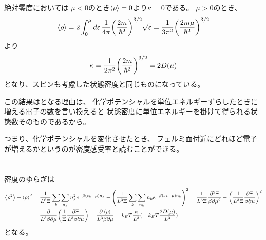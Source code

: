 \documentclass[../ap_2011.tex]{subfiles}
\begin{document}

絶対零度においては
\(\mu<0\)のとき\(\ev{\rho}=0\)より\(\kappa=0\)である。
\(\mu>0\)のとき、
\begin{equation}\begin{aligned}[b]
    \ev{\rho} = 2\int_0^\mu d\varepsilon\, \frac{1}{4\pi}\qty(\frac{2m}{\hbar^2})^{3/2}\sqrt{\varepsilon}
    =\frac{1}{3\pi^2}\qty(\frac{2m\mu}{\hbar^2})^{3/2}
\end{aligned}\end{equation}
より
\begin{equation}\begin{aligned}[b]
    \kappa = \frac{1}{2\pi^2}\qty(\frac{2m}{\hbar^2})^{3/2}=2D(\mu)
\end{aligned}\end{equation}
となり、スピンも考慮した状態密度と同じものになっている。

この結果はとなる理由は、
化学ポテンシャルを単位エネルギーずらしたときに増える電子の数を言い換えると
状態密度に単位エネルギーを掛けて得られる状態数そのものであるから。

つまり、化学ポテンシャルを変化させたとき、
フェルミ面付近にどれほど電子が増えるかというのが密度感受率と読むことができる。

\section{}
密度のゆらぎは
\begin{equation}\begin{aligned}[b]
    \ev{\rho^2}-\ev{\rho}^2
    &=\frac{1}{L^6\Xi}\sum_k\sum_{n_k}n_k^2e^{-\beta(\varepsilon_k-\mu)n_k}-\qty(\frac{1}{L^3\Xi}\sum_k\sum_{n_k}n_ke^{-\beta(\varepsilon_k-\mu)n_k})^2
    =\frac{1}{L^6\Xi}\frac{\partial^2\Xi}{\beta\partial\mu^2}-\qty(\frac{1}{L^3\Xi}\frac{\partial\Xi}{\beta\partial\mu})^2\\
    &=\frac{\partial}{L^3\beta\partial\mu}\qty(\frac{1}{\Xi}\frac{\partial \Xi}{L^3\beta\partial\mu})
    =\frac{\partial\ev{\rho}}{L^3\beta\partial\mu} = k_BT\frac{\kappa}{L^3} (= k_BT \frac{2D(\mu)}{L^3})
\end{aligned}\end{equation}
となる。
\end{document}
